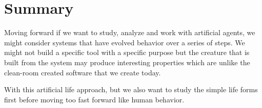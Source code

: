 \section{Summary}


Moving forward if we want to study, analyze and work with artificial agents, we
might consider systems that have evolved behavior over a series of steps.  We
might not build a specific tool with a specific purpose but the creature that is
built from the system may produce interesting properties which are unlike the
clean-room created software that we create today.

With this artificial life approach, but we also want to study the simple life
forms first before moving too fast forward like human behavior.
